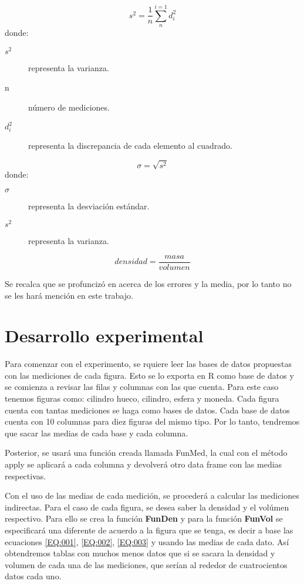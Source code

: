 \documentclass[%
 reprint,
groupedaddress,
unsortedaddress,
 amsmath,amssymb,
 aps,
superscriptaddress
]{revtex4-2}
\begin{document}
\begin{equation}\label{EQ:002}
	s^2 = \frac{1}{n} \sum_{n}^{i=1} d^2_i
\end{equation}
donde:
\begin{description}
	\item[$s^2$] representa la varianza.
	\item[n] número de mediciones.
	\item[$d^2_i$] representa la discrepancia de cada elemento al cuadrado.
\end{description}

\begin{equation}\label{EQ:003}
	\sigma = \sqrt{s^2}
\end{equation}
donde:
\begin{description}
	\item[$\sigma$] representa la desviación estándar.
	\item[$s^2$] representa la varianza.
\end{description}

\begin{equation}\label{EQ:004}
	densidad = \frac{masa}{volumen}
\end{equation}

Se recalca que se profuncizó en \cite{trabajopasado} acerca de los errores y la media, por lo tanto no se les hará mención en este trabajo. 

\section{Desarrollo experimental}

Para comenzar con el experimento, se rquiere leer las bases de datos propuestas con las mediciones de cada figura. Esto se lo exporta en R como base de datos y se comienza a revisar las filas y columnas con las que cuenta. Para este caso tenemos figuras como: cilindro hueco, cilindro, esfera y moneda. Cada figura cuenta con tantas mediciones se haga como bases de datos. Cada base de datos cuenta con 10 columnas para diez figuras del mismo tipo. Por lo tanto, tendremos que sacar las medias de cada base y cada columna.

Posterior, se usará una función creada llamada FunMed, la cual con el método apply se aplicará a cada columna y devolverá otro data frame con las medias respectivas.

Con el uso de las medias de cada medición, se procederá a calcular las mediciones indirectas. Para el caso de cada figura, se desea saber la densidad y el volúmen respectivo. Para ello se crea la función \textbf{FunDen} y para la función \textbf{FunVol} se especificará una diferente de acuerdo a la figura que se tenga, es decir a base las ecuaciones \eqref{EQ:001}, \eqref{EQ:002}, \eqref{EQ:003} y usando las medias de cada dato. Así obtendremos tablas con muchos menos datos que si se sacara la densidad y volumen de cada una de las mediciones, que serían al rededor de cuatrocientos datos cada uno.
\end{document}
